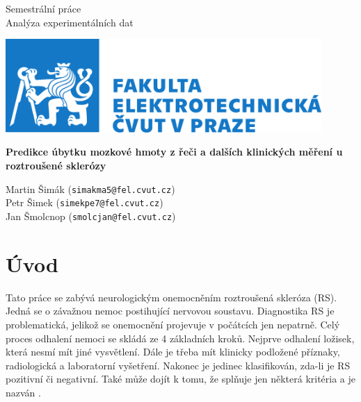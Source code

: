 \documentclass[11pt,a4paper]{article}
\begin{document}
	\begin{titlepage}
        \begin{center}
            \vspace*{2cm}

            {\Huge Semestrální práce}\\[0.5cm]
            {\Large Analýza experimentálních dat}
            \vspace{2cm}

            \includegraphics[width=0.9\textwidth]{src/logo_FEL.pdf}
            \vspace{2cm}

            \textbf{\LARGE Predikce úbytku mozkové hmoty z řeči a dalších klinických měření u roztroušené sklerózy}
            \vfill
            
            {\large Martin Šimák (\texttt{simakma5@fel.cvut.cz})}\\
            {\large Petr Šimek (\texttt{simekpe7@fel.cvut.cz})}\\
            {\large Jan Šmolcnop (\texttt{smolcjan@fel.cvut.cz})}
        \end{center}
    \end{titlepage}

	\newpage
	\section{Úvod}
            Tato práce se zabývá neurologickým onemocněním roztroušená skleróza (RS). Jedná se o závažnou nemoc postihující nervovou soustavu.  \cite{nicholas2013} Diagnostika RS je problematická, jelikož se onemocnění projevuje v počátcích jen nepatrně. Celý proces odhalení nemoci se skládá ze 4 základních kroků. Nejprve odhalení ložisek, která nesmí mít jiné vysvětlení. Dále je třeba mít klinicky podložené příznaky, radiologická a laboratorní vyšetření. Nakonec je jedinec klasifikován, zda-li je RS pozitivní či negativní. Také může dojít k tomu, že splňuje jen některá kritéria a je nazván  \cite{mcdonald2001}.
            
\end{document}
